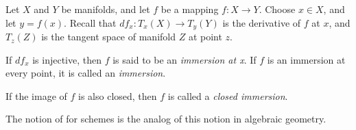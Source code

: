\documentclass[12pt]{article}
\begin{document}
Let $X$ and $Y$ be manifolds, and let $f$ be a mapping $f: X \to Y$. Choose $x \in X$, and let $y=f(x)$.  Recall that $df_x: T_x(X) \to T_y(Y)$ is the derivative of $f$ at $x$, and $T_z(Z)$ is the tangent space of manifold $Z$ at point $z$.

If $df_x$ is injective, then $f$ is said to be an \emph{immersion at x}. If $f$ is an immersion at every point, it is called an \emph{immersion}.

If the image of $f$ is also closed, then $f$ is called a \emph{closed immersion}. 

The notion of  for schemes is the analog of this notion in algebraic geometry.
\end{document}
